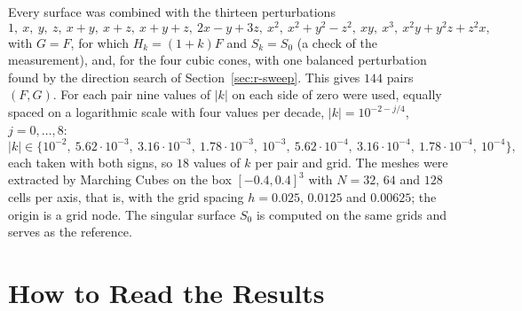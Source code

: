 \documentclass[12pt, a4paper, oneside]{book}
\theoremstyle{plain}
\theoremstyle{definition}
\theoremstyle{remark}
\theoremstyle{definition}
\begin{document}
Every surface was combined with the thirteen perturbations
\[
1,\ x,\ y,\ z,\ x+y,\ x+z,\ x+y+z,\ 2x-y+3z,\ x^2,\ x^2+y^2-z^2,\ xy,\ x^3,\ x^2y+y^2z+z^2x,
\]
with $G=F$, for which $H_k=(1+k)F$ and $S_k=S_0$ (a check of the measurement), and, for the four cubic cones, with one balanced perturbation found by the direction search of Section~\ref{sec:r-sweep}. This gives $144$ pairs $(F,G)$. For each pair nine values of $|k|$ on each side of zero were used, equally spaced on a logarithmic scale with four values per decade, $|k|=10^{-2-j/4}$, $j=0,\dots,8$:
\[
|k|\in\{10^{-2},\ 5.62\cdot10^{-3},\ 3.16\cdot10^{-3},\ 1.78\cdot10^{-3},\ 10^{-3},\ 5.62\cdot10^{-4},\ 3.16\cdot10^{-4},\ 1.78\cdot10^{-4},\ 10^{-4}\},
\]
each taken with both signs, so $18$ values of $k$ per pair and grid. The meshes were extracted by Marching Cubes on the box $[-0.4,0.4]^3$ with $N=32$, $64$ and $128$ cells per axis, that is, with the grid spacing $h=0.025$, $0.0125$ and $0.00625$; the origin is a grid node. The singular surface $S_0$ is computed on the same grids and serves as the reference.

\section{How to Read the Results}
\label{sec:r-read}
\end{document}
